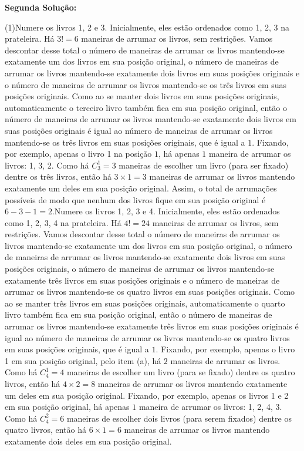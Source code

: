 \documentclass[oneside,a4paper,12pt]{article}
\newcommand{\negrito}[1]{\mbox{\boldmath{$#1$}}}
\theoremstyle{Colorido}
\theoremstyle{solu}
\theoremstyle{dotlessP}
\begin{document}
{\begin{tasks}[counter-format={(tsk[a])},label-width=3.6ex, label-format = {\bfseries}, column-sep = {20pt}]
\end{tasks}\textbf{Segunda Solução:}\begin{tasks}[counter-format={(tsk[a])},label-width=3.6ex, label-format = {\bfseries}, column-sep = {20pt}](1)\task[\textcolor{blue}{$\negrito{(a)} $}] Numere os livros 1, 2 e 3. Inicialmente, eles estão ordenados como 1, 2, 3 na prateleira. Há $3!=6$ maneiras de arrumar os livros, sem restrições. Vamos descontar desse total o número de maneiras de arrumar os livros mantendo-se exatamente um dos livros em sua posição original, o número de maneiras de arrumar os livros mantendo-se exatamente dois livros em suas posições originais e o número de maneiras de arrumar os livros mantendo-se os três livros em suas posições originais. Como ao se manter dois livros em suas posições originais, automaticamente o terceiro livro também fica em sua posição original, então o número de maneiras de arrumar os livros mantendo-se exatamente dois livros em suas posições originais é igual ao número de maneiras de arrumar os livros mantendo-se os três livros em suas posições originais, que é igual a $1$. Fixando, por exemplo, apenas o livro 1 na posição $1$, há apenas $1$ maneira de arrumar os livros: 1, 3, 2. Como há $C_3^1=3$ maneiras de escolher um livro (para ser fixado) dentre os três livros, então há $3\times1=3$ maneiras de arrumar os livros mantendo exatamente um deles em sua posição original. Assim, o total de arrumações possíveis de modo que nenhum dos livros fique em sua posição original é $6-3-1=2$.\task[\textcolor{blue}{$\negrito{(b)} $}] Numere os livros 1, 2, 3 e 4. Inicialmente, eles estão ordenados como 1, 2, 3, 4 na prateleira. Há $4!=24$ maneiras de arrumar os livros, sem restrições. Vamos descontar desse total o número de maneiras de arrumar os livros mantendo-se exatamente um dos livros em sua posição original, o número de maneiras de arrumar os livros mantendo-se exatamente dois livros em suas posições originais, o número de maneiras de arrumar os livros mantendo-se exatamente três livros em suas posições originais e o número de maneiras de arrumar os livros mantendo-se os quatro livros em suas posições originais. Como ao se manter três livros em suas posições originais, automaticamente o quarto livro também fica em sua posição original, então o número de maneiras de arrumar os livros mantendo-se exatamente três livros em suas posições originais é igual ao número de maneiras de arrumar os livros mantendo-se os quatro livros em suas posições originais, que é igual a $1$. Fixando, por exemplo, apenas o livro 1 em  sua posição original, pelo item (a), há $2$ maneiras de arrumar os livros. Como há $C_4^1=4$ maneiras de escolher um livro (para se fixado) dentre os quatro livros, então há $4\times2=8$ maneiras de arrumar os livros mantendo exatamente um deles em sua posição original. Fixando, por exemplo, apenas os livros 1 e 2 em sua posição original, há apenas $1$ maneira de arrumar os livros: 1, 2, 4, 3. Como há $C_4^2=6$ maneiras de escolher dois livros (para serem fixados) dentre os quatro livros, então há $6\times1=6$ maneiras de arrumar os livros mantendo exatamente dois deles em sua posição original. 
\end{tasks}}
\end{document}
